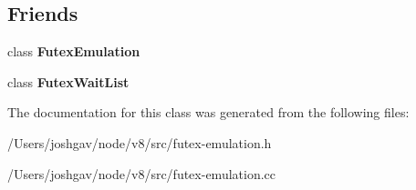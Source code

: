 \subsection*{Friends}
\begin{DoxyCompactItemize}
\item 
class {\bfseries Futex\+Emulation}\hypertarget{classv8_1_1internal_1_1_futex_wait_list_node_aac567adb4503b9486e8d84b85a01c1d8}{}\label{classv8_1_1internal_1_1_futex_wait_list_node_aac567adb4503b9486e8d84b85a01c1d8}

\item 
class {\bfseries Futex\+Wait\+List}\hypertarget{classv8_1_1internal_1_1_futex_wait_list_node_a6931106fbd22620029d4a5819e6f001d}{}\label{classv8_1_1internal_1_1_futex_wait_list_node_a6931106fbd22620029d4a5819e6f001d}

\end{DoxyCompactItemize}


The documentation for this class was generated from the following files\+:\begin{DoxyCompactItemize}
\item 
/\+Users/joshgav/node/v8/src/futex-\/emulation.\+h\item 
/\+Users/joshgav/node/v8/src/futex-\/emulation.\+cc\end{DoxyCompactItemize}
